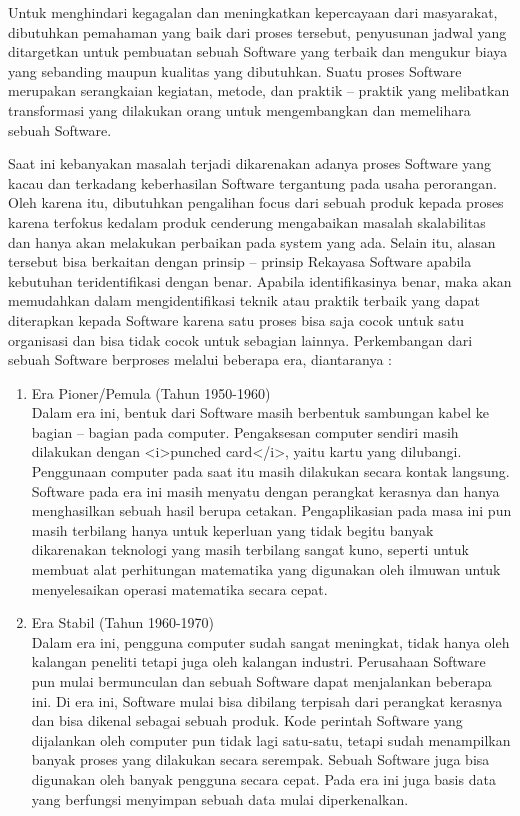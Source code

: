 \begin{flushleft}
Untuk menghindari kegagalan dan meningkatkan kepercayaan dari masyarakat, dibutuhkan pemahaman yang baik dari proses tersebut, penyusunan jadwal yang ditargetkan untuk pembuatan sebuah Software yang terbaik dan mengukur biaya yang sebanding maupun kualitas yang dibutuhkan. Suatu proses Software merupakan serangkaian kegiatan, metode, dan praktik – praktik yang melibatkan transformasi yang dilakukan orang untuk mengembangkan dan memelihara sebuah Software. 
\end{flushleft}
\begin{flushleft}
Saat ini kebanyakan masalah terjadi dikarenakan adanya proses Software yang kacau dan terkadang keberhasilan Software tergantung pada usaha perorangan. Oleh karena itu, dibutuhkan pengalihan focus dari sebuah produk kepada proses karena terfokus kedalam produk cenderung mengabaikan masalah skalabilitas dan hanya akan melakukan perbaikan pada system yang ada. Selain itu, alasan tersebut bisa berkaitan dengan prinsip – prinsip Rekayasa Software apabila kebutuhan teridentifikasi dengan benar. Apabila identifikasinya benar, maka akan memudahkan dalam mengidentifikasi teknik atau praktik terbaik yang dapat diterapkan kepada Software karena satu proses bisa saja cocok untuk satu organisasi dan bisa tidak cocok untuk sebagian lainnya. Perkembangan dari sebuah Software berproses melalui beberapa era, diantaranya :
\begin{enumerate}
	\item Era Pioner/Pemula (Tahun 1950-1960) \\	
Dalam era ini, bentuk dari Software masih berbentuk sambungan kabel ke bagian – bagian pada computer. Pengaksesan computer sendiri masih dilakukan dengan <i>punched card</i>, yaitu kartu yang dilubangi. Penggunaan computer pada saat itu masih dilakukan secara kontak langsung. Software pada era ini masih menyatu dengan perangkat kerasnya dan hanya menghasilkan sebuah hasil berupa cetakan. Pengaplikasian pada masa ini pun masih terbilang hanya untuk keperluan yang tidak begitu banyak dikarenakan teknologi yang masih terbilang sangat kuno, seperti untuk membuat alat perhitungan matematika yang digunakan oleh ilmuwan untuk menyelesaikan operasi matematika secara cepat. 
	\item Era Stabil (Tahun 1960-1970) \\
Dalam era ini, pengguna computer sudah sangat meningkat, tidak hanya oleh kalangan peneliti tetapi juga oleh kalangan industri. Perusahaan Software pun mulai bermunculan dan sebuah Software dapat menjalankan beberapa ini. Di era ini, Software mulai bisa dibilang terpisah dari perangkat kerasnya dan bisa dikenal sebagai sebuah produk. Kode perintah Software yang dijalankan oleh computer pun tidak lagi satu-satu, tetapi sudah menampilkan banyak proses yang dilakukan secara serempak. Sebuah Software juga bisa digunakan oleh banyak pengguna secara cepat. Pada era ini juga basis data yang berfungsi menyimpan sebuah data mulai diperkenalkan.

\end{enumerate}
\end{flushleft}
